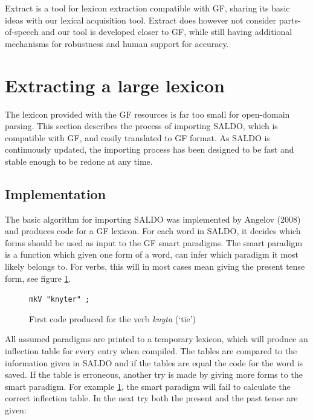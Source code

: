 \documentclass[10pt, a4paper]{article}
\begin{document}
Extract \cite{MarkusForsberg2007} is a tool for lexicon
extraction compatible with GF, sharing its basic ideas with our lexical
acquisition tool. Extract does however not consider parts-of-speech and our
tool is developed closer to GF, while still
having additional mechanisms for robustness and human support for accuracy.


\section{Extracting a large lexicon}
\label{sec:extractsaldo}
The lexicon provided with the GF resources is far too small for open-domain
parsing.
This section describes the process of importing SALDO, which is 
compatible with GF, and easily translated to GF format.
As SALDO is continuously updated, the importing process has been designed to be fast
and stable enough to be redone at any time.

\subsection{Implementation}
The basic algorithm for importing SALDO was implemented by Angelov (2008)
and  produces code for a GF lexicon.
For each word in SALDO, it decides which forms should be used as input
to the GF smart paradigms. The smart paradigm is a function which given one
form of a word, can infer which paradigm it most likely belongs to.
For verbs, this will in most cases mean giving
the present tense form, see figure \ref{fig:saldoknyt}. \\

\begin{figure}[h]
\begin{center}
\verb-mkV "knyter" ;-
\caption{First code produced for the verb \emph{knyta} (`tie')}
\label{fig:saldoknyt}
\end{center}
\end{figure}

All assumed paradigms are printed to a temporary lexicon, 
which will produce an inflection table for every entry when compiled.
The tables are compared to the information given
in SALDO and if the tables are equal the code for the word is saved. If the table
is erroneous, another try is made
by giving more forms to the smart paradigm.
For example \ref{fig:saldoknyt}, the smart paradigm will fail to calculate the
correct inflection table. In the next try both the present and the past tense
are given:\\
\end{document}
